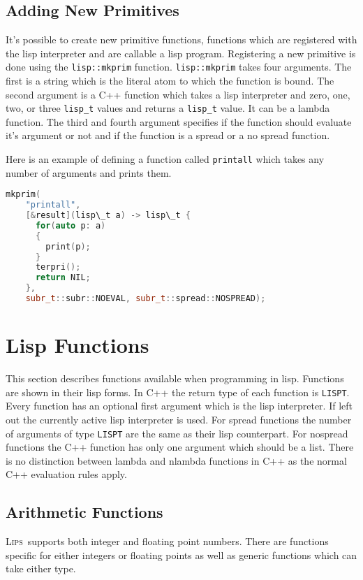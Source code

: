 \documentclass[a4paper]{article}
\newcommand{\lips}{\textsc{Lips}}
\newcommand{\lisp}[1]{\texttt{#1}}
\newcommand{\cpp}[1]{\texttt{#1}}
\begin{document}
\subsection{Adding New Primitives}
It's possible to create new primitive functions, functions which are
registered with the lisp interpreter and are callable a lisp
program. Registering a new primitive is done using the
\cpp{lisp::mkprim} function. \cpp{lisp::mkprim} takes four
arguments. The first is a string which is the literal atom to which
the function is bound. The second argument is a \textsf{C++} function
which takes a lisp interpreter and zero, one, two, or three
\cpp{lisp\_t} values and returns a \cpp{lisp\_t} value. It can be a lambda
function.  The third and fourth argument specifies if the function
should evaluate it's argument or not and if the function is a spread
or a no spread function.

Here is an example of defining a function called \lisp{printall} which
takes any number of arguments and prints them.

\begin{lstlisting}[language=c++]
  mkprim(
    "printall",
    [&result](lisp\_t a) -> lisp\_t {
      for(auto p: a)
      {
        print(p);
      }
      terpri();
      return NIL;
    },
    subr_t::subr::NOEVAL, subr_t::spread::NOSPREAD);
\end{lstlisting}

\section{Lisp Functions}
\label{functions}
This section describes functions available when programming in lisp.
Functions are shown in their lisp forms.  In \textsf{C++} the return
type of each function is \cpp{LISPT}.  Every function has an optional
first argument which is the lisp interpreter.  If left out the
currently active lisp interpreter is used.  For spread functions the
number of arguments of type \cpp{LISPT} are the same as their lisp
counterpart.  For nospread functions the \textsf{C++} function has
only one argument which should be a list.  There is no distinction
between lambda and nlambda functions in \textsf{C++} as the normal
\textsf{C++} evaluation rules apply.

\subsection{Arithmetic Functions}
\lips\ supports both integer and floating point numbers. There are
functions specific for either integers or floating points as well as
generic functions which can take either type.
\end{document}
